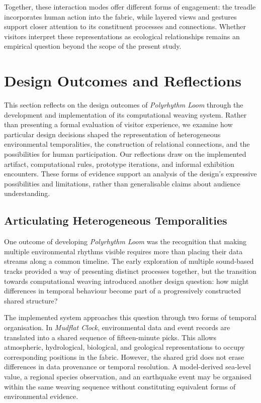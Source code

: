 \documentclass[manuscript,review,anonymous]{acmart}
\begin{document}
Together, these interaction modes offer different forms of engagement: the treadle incorporates human action into the fabric, while layered views and gestures support closer attention to its constituent processes and connections. Whether visitors interpret these representations as ecological relationships remains an empirical question beyond the scope of the present study.

\section{Design Outcomes and Reflections}

This section reflects on the design outcomes of \emph{Polyrhythm Loom} through the development and implementation of its computational weaving system. Rather than presenting a formal evaluation of visitor experience, we examine how particular design decisions shaped the representation of heterogeneous environmental temporalities, the construction of relational connections, and the possibilities for human participation. Our reflections draw on the implemented artifact, computational rules, prototype iterations, and informal exhibition encounters. These forms of evidence support an analysis of the design's expressive possibilities and limitations, rather than generalisable claims about audience understanding.

\subsection{Articulating Heterogeneous Temporalities}

One outcome of developing \emph{Polyrhythm Loom} was the recognition that making multiple environmental rhythms visible requires more than placing their data streams along a common timeline. The early exploration of multiple sound-based tracks provided a way of presenting distinct processes together, but the transition towards computational weaving introduced another design question: how might differences in temporal behaviour become part of a progressively constructed shared structure?

The implemented system approaches this question through two forms of temporal organisation. In \emph{Mudflat Clock}, environmental data and event records are translated into a shared sequence of fifteen-minute picks. This allows atmospheric, hydrological, biological, and geological representations to occupy corresponding positions in the fabric. However, the shared grid does not erase differences in data provenance or temporal resolution. A model-derived sea-level value, a regional species observation, and an earthquake event may be organised within the same weaving sequence without constituting equivalent forms of environmental evidence.
\end{document}
